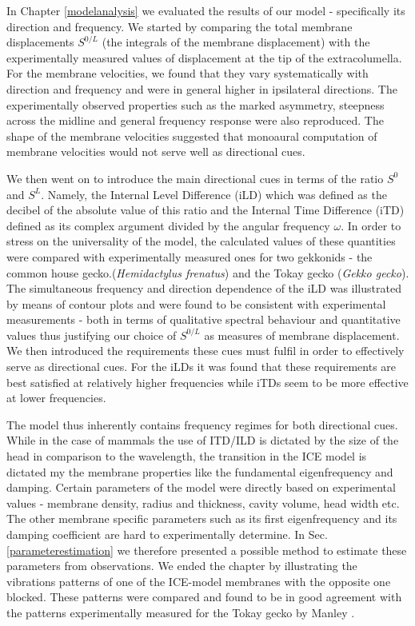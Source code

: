 In Chapter \ref{modelanalysis} we evaluated the results of our model - specifically its direction and frequency. We started
by comparing the total membrane displacements $S^{0/L}$ (the integrals of the membrane displacement) with the experimentally 
measured values of displacement at the tip of the extracolumella. 
For the membrane velocities, we found that they vary systematically with
direction and frequency and were in general higher in ipsilateral directions. The experimentally observed properties such
as the marked asymmetry, steepness across the midline and general frequency response were also reproduced. The shape of the membrane
velocities suggested that monoaural computation of membrane velocities would not serve well as directional cues.

We then went on to introduce the main directional cues in terms of the ratio $S^{0}$ and $S^{L}$. Namely, the Internal Level Difference
(iLD) which was defined as the decibel of the absolute value of this ratio and the Internal Time Difference (iTD) defined as its complex
argument divided by the angular frequency $\omega$. In order to stress on the universality of the model, the calculated values of these
 quantities were compared with experimentally measured ones for two gekkonids - the common house gecko.(\emph{Hemidactylus frenatus}) and the Tokay gecko
 (\emph{Gekko gecko}). The simultaneous frequency and direction dependence of the iLD was illustrated by
means of contour plots and were found to be consistent with experimental measurements - both in terms of qualitative spectral behaviour and
quantitative values thus justifying our choice of $S^{0/L}$ as measures of membrane displacement. We then introduced the requirements these cues must fulfil in order to effectively serve as
directional cues. For the iLDs it was found that these requirements are best satisfied at relatively higher frequencies while
 iTDs seem to be more effective at lower frequencies.
 
The model thus inherently contains frequency regimes for both directional cues. While in the case of mammals the use of ITD/ILD
is dictated by the size of the head in comparison to the wavelength, the transition in the ICE model is dictated my the membrane
properties like the fundamental eigenfrequency and damping. Certain parameters of the model were directly based on experimental
values - membrane density, radius and thickness, cavity volume, head width etc. The other membrane specific parameters such
as its first eigenfrequency and its damping coefficient are hard to experimentally determine. In Sec. \ref{parameterestimation} we therefore presented
a possible method to estimate these parameters from observations. We ended the chapter by illustrating the vibrations patterns of one of the ICE-model
membranes with the opposite one blocked. These patterns were compared and found to be in good agreement with the patterns experimentally measured for the Tokay gecko by Manley \cite{manleygecko1}.
